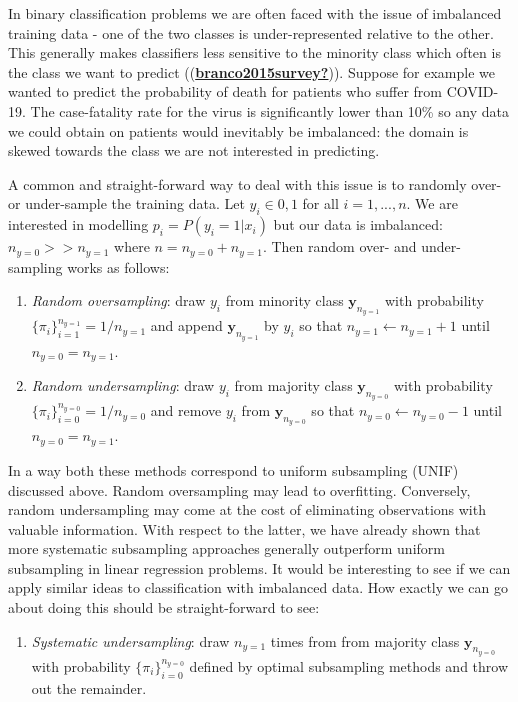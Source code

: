\documentclass[
]{book}
\providecommand{\tightlist}{%
  \setlength{\itemsep}{0pt}\setlength{\parskip}{0pt}}
\begin{document}
In binary classification problems we are often faced with the issue of imbalanced training data - one of the two classes is under-represented relative to the other. This generally makes classifiers less sensitive to the minority class which often is the class we want to predict ((\protect\hyperlink{ref-branco2015survey}{\textbf{branco2015survey?}})). Suppose for example we wanted to predict the probability of death for patients who suffer from COVID-19. The case-fatality rate for the virus is significantly lower than 10\% so any data we could obtain on patients would inevitably be imbalanced: the domain is skewed towards the class we are not interested in predicting.

A common and straight-forward way to deal with this issue is to randomly over- or under-sample the training data. Let \(y_i\in{0,1}\) for all \(i=1,...,n\). We are interested in modelling \(p_i=P(y_i=1|x_i)\) but our data is imbalanced: \(n_{y=0}>>n_{y=1}\) where \(n=n_{y=0}+n_{y=1}\). Then random over- and under-sampling works as follows:

\begin{enumerate}
\def\labelenumi{\arabic{enumi}.}
\tightlist
\item
  \emph{Random oversampling}: draw \(y_i\) from minority class \(\mathbf{y}_{n_{y=1}}\) with probability \(\{\pi_i\}^{n_{y=1}}_{i=1}=1/n_{y=1}\) and append \(\mathbf{y}_{n_{y=1}}\) by \(y_i\) so that \(n_{y=1} \leftarrow n_{y=1}+1\) until \(n_{y=0}=n_{y=1}\).
\item
  \emph{Random undersampling}: draw \(y_i\) from majority class \(\mathbf{y}_{n_{y=0}}\) with probability \(\{\pi_i\}^{n_{y=0}}_{i=0}=1/n_{y=0}\) and remove \(y_i\) from \(\mathbf{y}_{n_{y=0}}\) so that \(n_{y=0} \leftarrow n_{y=0}-1\) until \(n_{y=0}=n_{y=1}\).
\end{enumerate}

In a way both these methods correspond to uniform subsampling (UNIF) discussed above. Random oversampling may lead to overfitting. Conversely, random undersampling may come at the cost of eliminating observations with valuable information. With respect to the latter, we have already shown that more systematic subsampling approaches generally outperform uniform subsampling in linear regression problems. It would be interesting to see if we can apply similar ideas to classification with imbalanced data. How exactly we can go about doing this should be straight-forward to see:

\begin{enumerate}
\def\labelenumi{\arabic{enumi}.}
\setcounter{enumi}{2}
\tightlist
\item
  \emph{Systematic undersampling}: draw \(n_{y=1}\) times from from majority class \(\mathbf{y}_{n_{y=0}}\) with probability \(\{\pi_i\}^{n_{y=0}}_{i=0}\) defined by optimal subsampling methods and throw out the remainder.
\end{enumerate}
\end{document}
